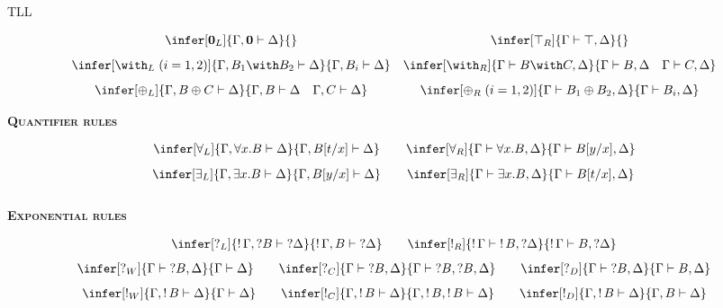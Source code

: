 \begin{entry}{TLL}
\begin{calculus}
\[\begin{array}{cc}
\infer[\zero_L]{\Gamma,\zero \vdash\Delta}{}&
\infer[\top_R]{\Gamma \vdash\top, \Delta}{}
  \\[8pt]
\infer[\with_L\;(i=1,2)]{\Gamma,B_1\with B_2\vdash \Delta}{\Gamma,B_i\vdash \Delta}
& 
\infer[\with_R]{\Gamma \vdash B\with C, \Delta}{\Gamma \vdash B,\Delta\quad\Gamma \vdash C,\Delta}
\\[8pt]
 \infer[\oplus_L]{\Gamma,B\oplus C \vdash \Delta}{\Gamma,B\vdash \Delta \quad \Gamma,C\vdash \Delta}
  &
  \infer[\oplus_R\;(i=1,2)]{\Gamma \vdash B_1\oplus B_2, \Delta}{\Gamma \vdash B_i,\Delta}
\end{array}
\]
\begin{center}
 \textsc{\bf Quantifier rules}
\end{center}
\vspace{-5px}
\[
\begin{array}{cc}
\infer[\forall_L]{\Gamma,\forall x.B\vdash \Delta}{\Gamma,B[t/x]\vdash \Delta}\quad
& 
\infer[\forall_R]{\Gamma \vdash \forall x.B, \Delta}{\Gamma \vdash B[y/x],\Delta}
\\[8pt]
\infer[\exists_L]{\Gamma,\exists x.B\vdash \Delta}{\Gamma,B[y/x]\vdash \Delta}\quad
& 
\infer[\exists_R]{\Gamma \vdash \exists x.B, \Delta}{\Gamma \vdash B[t/x],\Delta}
\\[8pt]
\end{array}
\]
\begin{center}
 \textsc{\bf Exponential rules}
\end{center}
\vspace{-5px}
\[
\begin{array}{cc}
\infer[\quest_L]{\bang\Gamma,\quest B\vdash \quest\Delta}{\bang\Gamma,B\vdash \quest\Delta}\quad
& 
\infer[\bang_R]{\bang\Gamma\vdash \bang B,\quest\Delta}{\bang\Gamma\vdash B, \quest\Delta}
\end{array}
\]
\[
\begin{array}{ccc}
\infer[\quest_W]{\Gamma\vdash \quest B,\Delta}{\Gamma\vdash \Delta}\quad
& 
\infer[\quest_C]{\Gamma\vdash \quest B,\Delta}{\Gamma\vdash \quest B,\quest B, \Delta}\quad
& 
\infer[\quest_D]{\Gamma\vdash \quest B,\Delta}{\Gamma\vdash B, \Delta}
\end{array}
\]
\[
\begin{array}{ccc}
\infer[\bang_W]{\Gamma,\bang B\vdash \Delta}{\Gamma\vdash \Delta}\quad
& 
\infer[\bang_C]{\Gamma,\bang B\vdash \Delta}{\Gamma,\bang B,\bang B\vdash \Delta}\quad
& 
\infer[\bang_D]{\Gamma,\bang B\vdash \Delta}{\Gamma, B\vdash \Delta}
\end{array}
\]


\end{calculus}
\end{entry}
